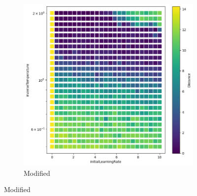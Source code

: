 \begin{frame}
{\begin{figure}
\begin{subfigure}{0.5\textwidth}
            \includegraphics[width=\textwidth]{images/afterHyperparameterSearches/modified/Scatter-interactionVertex002.png}
            \caption*{Modified}
        \end{subfigure}
    \end{figure}
}


\end{frame}

